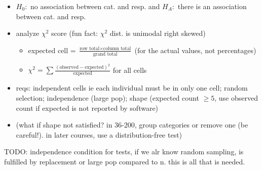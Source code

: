 \documentclass[11pt]{article}
\begin{document}
\begin{itemize}
\begin{itemize}
    \item $H_0:$ no association between cat. and resp. and $H_A:$ there is an association between cat. and resp.
    \item analyze $\chi^2$ score (fun fact: $\chi^2$ dist. is unimodal right skewed)
    \begin{itemize}
      \item expected cell = $\frac{\text{row total} \times \text{column total}}{\text{grand total}}$ (for the actual values, not percentages)
      \item $\chi^2 = \sum \frac{(\text{observed} - \text{expected})^2}{\text{expected}}$ for all cells
    \end{itemize}
    \item reqs: independent cells ie each individual must be in only one cell; random selection; independence (large pop); shape (expected count $\ge 5$, use observed count if expected is not reported by software)
    \item (what if shape not satisfied? in 36-200, group categories or remove one (be careful!). in later courses, use a distribution-free test)
  \end{itemize}
\end{itemize}
TODO: independence condition for tests, if we alr know random sampling, is fulfilled by replacement or large pop compared to n. this is all that is needed.

\end{document}
